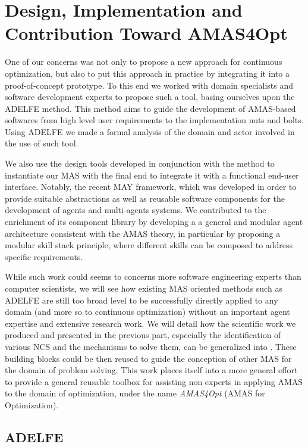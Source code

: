 \part{Design, Implementation and Contribution Toward AMAS4Opt}

One of our concerns was not only to propose a new approach for continuous optimization, but also to put this approach in practice by integrating it into a proof-of-concept prototype. To this end we worked with domain specialists and software development experts to propose such a tool, basing ourselves upon the ADELFE method. This method aims to guide the development of AMAS-based softwares from high level user requirements to the implementation nuts and bolts. Using ADELFE we made a formal analysis of the domain and actor involved in the use of such tool.

We also use the design tools developed in conjunction with the method to instantiate our MAS with the final end to integrate it with a functional end-user interface. Notably, the recent MAY framework, which was developed in order to provide suitable abstractions as well as reusable software components for the development of agents and multi-agents systems. We contributed to the enrichment of its component library by developing a a general and modular agent architecture consistent with the AMAS theory, in particular by proposing a modular skill stack principle, where different skills can be composed to address specific requirements.

While such work could seems to concerns more software engineering experts than computer scientists, we will see how existing MAS oriented methods such as ADELFE are still too broad level to be successfully directly applied to any domain (and more so to continuous optimization) without an important agent expertise and extensive research work. We will detail how the scientific work we produced and presented in the previous part, especially the identification of various NCS and the mechanisms to solve them, can be generalized into . These building blocks could be then reused to guide the conception of other MAS for the domain of problem solving. This work places itself into a more general effort to provide a general reusable toolbox for assisting non experts in applying AMAS to the domain of optimization, under the name \emph{AMAS4Opt} (AMAS for Optimization).

\chapter{ADELFE}

